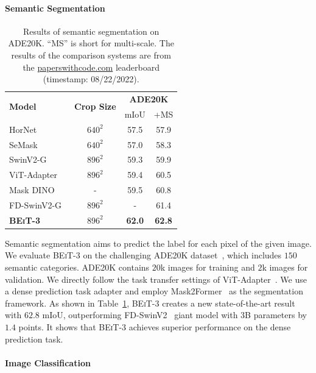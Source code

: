 \documentclass{article}
\newcommand\our{\textsc{BEiT-3}}
\begin{document}
\paragraph{Semantic Segmentation} 

\begin{table}[t]
\centering
\begin{tabular}{@{}lccc@{}}
\toprule
\multirow{2}{*}{\bf Model} & \multirow{2}{*}{\bf Crop Size} & \multicolumn{2}{c}{\bf ADE20K} \\
 & & mIoU & +MS \\
\midrule
HorNet~\citep{HorNet} & $640^2$ & 57.5 & 57.9 \\
SeMask~\citep{jain2021semask} & $640^2$ & 57.0 & 58.3 \\
SwinV2-G~\citep{swinv2} & $896^2$ & 59.3 & 59.9 \\
ViT-Adapter~\citep{vit-adapter} & $896^2$ & 59.4 & 60.5 \\
Mask DINO~\citep{mask_dino} & - & 59.5 & 60.8 \\
FD-SwinV2-G~\citep{fd-swin} & $896^2$ & - & 61.4 \\
\midrule
\bf \our{} & $896^2$ & \bf 62.0 & \bf 62.8 \\
\bottomrule
\end{tabular}
\caption[Caption protect]{Results of semantic segmentation on ADE20K.
``MS'' is short for multi-scale.
The results of the comparison systems are from the \href{https://paperswithcode.com/sota/semantic-segmentation-on-ade20k}{paperswithcode.com} leaderboard (timestamp: 08/22/2022).
}
\label{tbl:results:ade20k}
\end{table}

Semantic segmentation aims to predict the label for each pixel of the given image.
We evaluate \our{} on the challenging ADE20K dataset~\citep{ade20k}, which includes $150$ semantic categories.
ADE20K contains $20$k images for training and $2$k images for validation.
We directly follow the task transfer settings of ViT-Adapter~\citep{vit-adapter}.
We use a dense prediction task adapter and employ Mask2Former~\citep{mask2former} as the segmentation framework.
As shown in Table~\ref{tbl:results:ade20k}, \our{} creates a new state-of-the-art result with $62.8$ mIoU, outperforming FD-SwinV2~\citep{fd-swin} giant model with 3B parameters by $1.4$ points.
It shows that \our{} achieves superior performance on the dense prediction task.


\paragraph{Image Classification}
\end{document}
